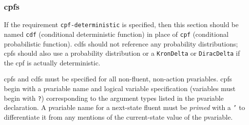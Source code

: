 \documentclass[11pt,a4paper]{article}
\begin{document}
\subsubsection{cpfs}

\label{sec:cpfs}

If the requirement \texttt{cpf-deterministic} is specified, then this
section should be named \texttt{cdf} (conditional deterministic
function) in place of \texttt{cpf} (conditional probabilistic
function).  cdfs should not reference any probability distributions;
cpfs should also use a probability distribution or a \texttt{KronDelta}
or \texttt{DiracDelta} if the cpf is actually deterministic.

cpfs and cdfs must be specified for all non-fluent, non-action
pvariables.  cpfs begin with a pvariable name and logical 
variable specification (variables must begin with \texttt{?})
corresponding to the argument types listed in the pvariable
declaration.  A pvariable name for a next-state fluent must
be \emph{primed} with a \texttt{'} to differentiate it from any
mentions of the current-state value of the pvariable.
\end{document}
